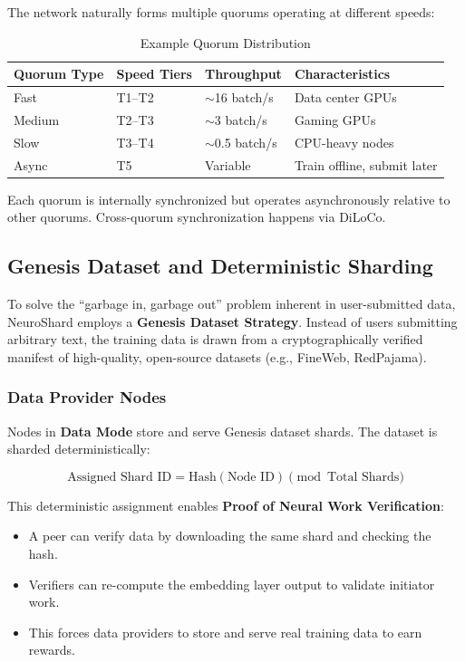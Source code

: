 \documentclass[11pt,a4paper]{article}
\begin{document}
The network naturally forms multiple quorums operating at different speeds:

\begin{table}[H]
\centering
\caption{Example Quorum Distribution}
\begin{tabular}{@{}llll@{}}
\toprule
\textbf{Quorum Type} & \textbf{Speed Tiers} & \textbf{Throughput} & \textbf{Characteristics} \\
\midrule
Fast & T1--T2 & $\sim$16 batch/s & Data center GPUs \\
Medium & T2--T3 & $\sim$3 batch/s & Gaming GPUs \\
Slow & T3--T4 & $\sim$0.5 batch/s & CPU-heavy nodes \\
Async & T5 & Variable & Train offline, submit later \\
\bottomrule
\end{tabular}
\end{table}

Each quorum is internally synchronized but operates asynchronously relative to other quorums. Cross-quorum synchronization happens via DiLoCo.

\subsection{Genesis Dataset and Deterministic Sharding}

To solve the ``garbage in, garbage out'' problem inherent in user-submitted data, NeuroShard employs a \textbf{Genesis Dataset Strategy}. Instead of users submitting arbitrary text, the training data is drawn from a cryptographically verified manifest of high-quality, open-source datasets (e.g., FineWeb, RedPajama).

\subsubsection{Data Provider Nodes}
Nodes in \textbf{Data Mode} store and serve Genesis dataset shards. The dataset is sharded deterministically:

\begin{equation}
\text{Assigned Shard ID} = \text{Hash}(\text{Node ID}) \pmod{\text{Total Shards}}
\end{equation}

This deterministic assignment enables \textbf{Proof of Neural Work Verification}:
\begin{itemize}
    \item A peer can verify data by downloading the same shard and checking the hash.
    \item Verifiers can re-compute the embedding layer output to validate initiator work.
    \item This forces data providers to store and serve real training data to earn rewards.
\end{itemize}
\end{document}
